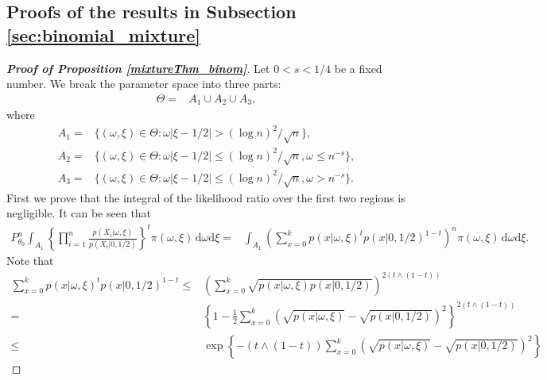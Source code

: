 \documentclass[11pt]{article}
\theoremstyle{plain}
\theoremstyle{definition}
\theoremstyle{remark}
\begin{document}
\begin{appendices}
\subsection{Proofs of the results in Subsection \ref{sec:binomial_mixture}}

\begin{proof}[\textbf{Proof of Proposition \ref{mixtureThm_binom}}]

    Let $0< s < 1/4$ be a fixed number.
    We break the parameter space into three parts:
    \begin{align*}
        \Theta
        =
        &
        A_1 
        \cup
        A_2
        \cup
        A_3
    ,
    \end{align*}
    where
    \begin{align*}
         A_1 =& 
        \{(\omega, \xi) \in \Theta:
            \omega | \xi - 1/2 | > {(\log n)^2}/{ \sqrt n}
        \} ,
    \\
    A_2 = &
        \{(\omega, \xi) \in \Theta:
            \omega | \xi - 1/2 | \leq {(\log n)^2}/{ \sqrt n}, 
            \omega \leq n^{-s}
        \},
    \\
    A_3 = &
        \{(\omega, \xi) \in \Theta:
            \omega | \xi - 1/2 | \leq {(\log n)^2}/{ \sqrt n}, 
            \omega > n^{-s}
        \}.
    \end{align*}
    First we prove that the integral of the likelihood ratio over the first two regions is negligible.
    It can be seen that 
\begin{equation*}
    \begin{split}
        P^n_{\theta_0} \int_{A_1} \left\{\prod_{i=1}^n \frac{p(X_i|\omega, \xi)}{p(X_i|0, 1/2 )}\right\}^t \pi(\omega, \xi)\, \mathrm d\omega \mathrm d \xi
    =&
    \int_{A_1} \left( \sum_{x=0}^k p( x |\omega, \xi)^t p( x |0, 1/2 )^{1-t} \right)^n \pi(\omega, \xi)\, \mathrm d\omega \mathrm d \xi.
    \end{split}
\end{equation*}
Note that
\begin{align*}
    \sum_{x=0}^k p( x |\omega, \xi)^t p( x |0, 1/2  )^{1-t}
    \leq&  \left( \sum_{x=0}^k \sqrt{p( x |\omega, \xi) p( x |0, 1/2 )} \right)^{2(t\wedge (1-t))}
    \\
    = & \left\{1-\frac{1}{2} \sum_{x=0}^k \left(\sqrt{p( x |\omega, \xi) }-\sqrt{p( x |0, 1/2  )}\right)^2 \right\}^{2(t\wedge (1-t))}
\\
\leq & \exp \left\{ -(t\wedge (1-t)) \sum_{x=0}^k \left(\sqrt{p( x |\omega,\xi) }-\sqrt{p( x |0, 1/2  )}\right)^2 \right\}

\end{align*}
\end{proof}
\end{appendices}
\end{document}
